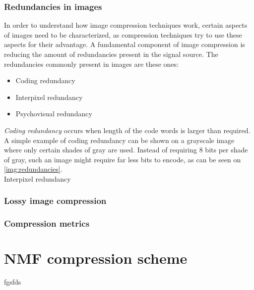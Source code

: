 \documentclass[thesis=M,english]{FITthesis}[2012/10/20]
\begin{document}
\subsection{Redundancies in images}
\label{sec:imgcmpr-redund}
In order to understand how image compression techniques work, certain aspects of
images need to be characterized, as compression techniques try to use these
aspects for their advantage. A fundamental component of image compression is
reducing the amount of redundancies present in the signal source. The redundancies
commonly present in images are these ones:

\begin{itemize}
  \item Coding redundancy
  \item Interpixel redundancy
  \item Psychovisual redundancy
\end{itemize}
\cite{fromdcttowavelet}

\emph{Coding redundancy} occurs when length of the code words is larger than
required. A simple example of coding redundancy can be shown on a grayscale
image where only certain shades of gray are used. Instead of requiring
8 bits per shade of gray, such an image might require far less bits to
encode, as can be seen on \ref{img:redundancies}.
\\

Interpixel redundancy

\subsection{Lossy image compression}


\subsection{Compression metrics}
\label{metrics}





\chapter{NMF compression scheme}
fgsfds
\end{document}
